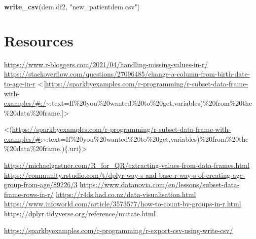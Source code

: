 \documentclass[
]{article}
\newenvironment{Shaded}{\begin{snugshade}}{\end{snugshade}}
\newcommand{\FunctionTok}[1]{\textcolor[rgb]{0.13,0.29,0.53}{\textbf{#1}}}
\newcommand{\NormalTok}[1]{#1}
\newcommand{\StringTok}[1]{\textcolor[rgb]{0.31,0.60,0.02}{#1}}
\begin{document}
\begin{Shaded}
\begin{Highlighting}[]
\FunctionTok{write\_csv}\NormalTok{(dem.df2, }\StringTok{"new\_patientdem.csv"}\NormalTok{) }
\end{Highlighting}
\end{Shaded}

\hypertarget{resources}{%
\section{Resources}\label{resources}}

\url{https://www.r-bloggers.com/2021/04/handling-missing-values-in-r/}
\url{https://stackoverflow.com/questions/27096485/change-a-column-from-birth-date-to-age-in-r}
\textless{[}\url{https://sparkbyexamples.com/r-programming/r-subset-data-frame-with-examples/\#:/}\textasciitilde:text=If\%20you\%20wanted\%20to\%20get,variables)\%20from\%20the\%20data\%20frame.{]}\textgreater{}

\textless(\url{https://sparkbyexamples.com/r-programming/r-subset-data-frame-with-examples/\#}:\textasciitilde:text=If\%20you\%20wanted\%20to\%20get,variables)\%20from\%20the\%20data\%20frame.)\{.uri\}\textgreater{}

\url{https://michaelgastner.com/R_for_QR/extracting-values-from-data-frames.html}
\url{https://community.rstudio.com/t/dplyr-way-s-and-base-r-way-s-of-creating-age-group-from-age/89226/3}
\url{https://www.datanovia.com/en/lessons/subset-data-frame-rows-in-r/}
\url{https://r4ds.had.co.nz/data-visualisation.html}
\url{https://www.infoworld.com/article/3573577/how-to-count-by-groups-in-r.html}
\url{https://dplyr.tidyverse.org/reference/mutate.html}

\url{https://sparkbyexamples.com/r-programming/r-export-csv-using-write-csv/}
\end{document}
